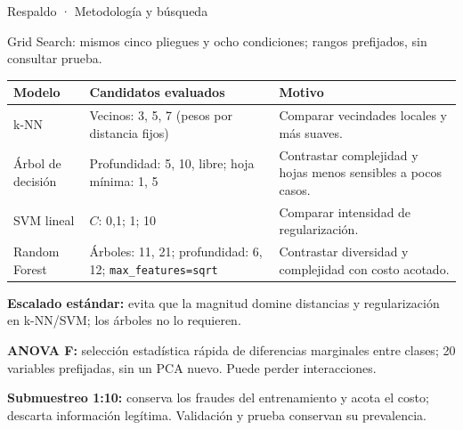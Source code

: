 \documentclass[aspectratio=169,10pt]{beamer}
\begin{document}
\begin{frame}{Respaldo · Metodología y búsqueda}
  \raggedright
  {\small\color{FraudGray}Grid Search: mismos cinco pliegues y ocho condiciones; rangos prefijados, sin consultar prueba.}\par
  \vspace{0.2cm}
  {\scriptsize
  \begin{tabularx}{\textwidth}{>{\raggedright\arraybackslash}p{2.35cm} >{\raggedright\arraybackslash}p{4.4cm} X}
    \toprule
    \rowcolor{FraudPaleBlue}\textbf{Modelo} & \textbf{Candidatos evaluados} & \textbf{Motivo} \\
    \midrule
    k-NN & Vecinos: 3, 5, 7 (pesos por distancia fijos) & Comparar vecindades locales y más suaves. \\
    \rowcolor{FraudLightGray}
    Árbol de decisión & Profundidad: 5, 10, libre; hoja mínima: 1, 5 & Contrastar complejidad y hojas menos sensibles a pocos casos. \\
    SVM lineal & $C$: 0,1; 1; 10 & Comparar intensidad de regularización. \\
    \rowcolor{FraudLightGray}
    Random Forest & Árboles: 11, 21; profundidad: 6, 12; \texttt{max\_features=sqrt} & Contrastar diversidad y complejidad con costo acotado. \\
    \bottomrule
  \end{tabularx}}
  \vspace{0.2cm}
  {\small\textbf{Escalado estándar:} evita que la magnitud domine distancias y regularización en k-NN/SVM; los árboles no lo requieren.}\par
  \vspace{0.12cm}
  {\small\textbf{ANOVA F:} selección estadística rápida de diferencias marginales entre clases; 20 variables prefijadas, sin un PCA nuevo. Puede perder interacciones.}\par
  \vspace{0.12cm}
  {\small\textbf{Submuestreo 1:10:} conserva los fraudes del entrenamiento y acota el costo; descarta información legítima. Validación y prueba conservan su prevalencia.}\par
\end{frame}
\end{document}
